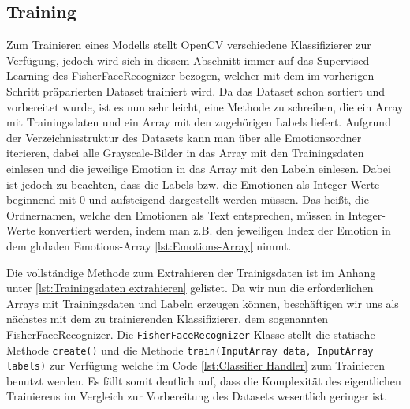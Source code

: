 \documentclass[12pt, a4paper]{report}
\begin{document}
\subsection{Training}
Zum Trainieren eines Modells stellt OpenCV verschiedene Klassifizierer zur Verfügung, jedoch wird sich in diesem Abschnitt immer auf das Supervised Learning des FisherFaceRecognizer bezogen, welcher mit dem im vorherigen Schritt präparierten Dataset trainiert wird. Da das Dataset schon sortiert und vorbereitet wurde, ist es nun sehr leicht, eine Methode zu schreiben, die ein Array mit Trainingsdaten und ein Array mit den zugehörigen Labels liefert. Aufgrund der Verzeichnisstruktur des Datasets kann man über alle Emotionsordner iterieren, dabei alle Grayscale-Bilder in das Array mit den Trainingsdaten einlesen und die jeweilige Emotion in das Array mit den Labeln einlesen. Dabei ist jedoch zu beachten, dass die Labels bzw. die Emotionen als Integer-Werte beginnend mit 0 und aufsteigend dargestellt werden müssen. Das heißt, die Ordnernamen, welche den Emotionen als Text entsprechen, müssen in Integer-Werte konvertiert werden, indem man z.B. den jeweiligen Index der Emotion in dem globalen Emotions-Array \ref{lst:Emotions-Array} nimmt.

Die vollständige Methode zum Extrahieren der Trainigsdaten ist im Anhang unter \ref{lst:Trainingsdaten extrahieren} gelistet. 
Da wir nun die erforderlichen Arrays mit Trainingsdaten und Labeln erzeugen können, beschäftigen wir uns als nächstes mit dem zu trainierenden Klassifizierer, dem sogenannten FisherFaceRecognizer. Die \texttt{FisherFaceRecognizer}-Klasse stellt die statische Methode \texttt{create()} und die Methode \texttt{train(InputArray data, InputArray labels)} zur Verfügung welche im Code \ref{lst:Classifier Handler} zum Trainieren benutzt werden. Es fällt somit deutlich auf, dass die Komplexität des eigentlichen Trainierens im Vergleich zur Vorbereitung des Datasets wesentlich geringer ist.
\end{document}
